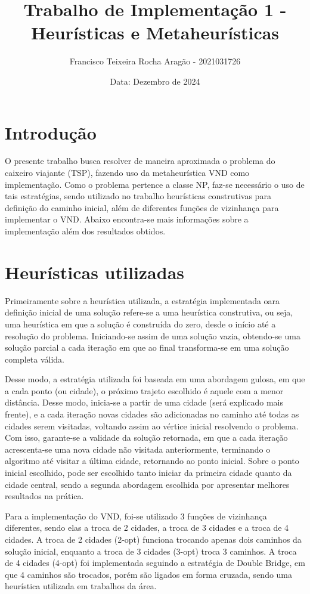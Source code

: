 \documentclass[10pt]{extarticle} %
\title{Trabalho de Implementação 1 - Heurísticas e Metaheurísticas}
\author{Francisco Teixeira Rocha Aragão - 2021031726}
\date{Data: Dezembro de 2024}
\begin{document}
\maketitle

\section{Introdução}

O presente trabalho busca resolver de maneira aproximada o problema do caixeiro viajante (TSP), fazendo uso da metaheurística VND como implementação. Como o problema pertence a classe NP, faz-se necessário o uso de tais estratégias, sendo utilizado no trabalho heurísticas construtivas para definição do caminho inicial, além de diferentes funções de vizinhança para implementar o VND. Abaixo encontra-se mais informações sobre a implementação além dos resultados obtidos.

\section{Heurísticas utilizadas}

Primeiramente sobre a heurística utilizada, a estratégia implementada oara definição inicial de uma solução refere-se a uma heurística construtiva, ou seja, uma heurística em que a solução é construída do zero, desde o início até a resolução do problema. Iniciando-se assim de uma solução vazia, obtendo-se uma solução parcial a cada iteração em que ao final transforma-se em uma solução completa válida.

Desse modo, a estratégia utilizada foi baseada em uma abordagem gulosa, em que a cada ponto (ou cidade), o próximo trajeto escolhido é aquele com a menor distância. Desse modo, inicia-se a partir de uma cidade (será explicado mais frente), e a cada iteração novas cidades são adicionadas no caminho até todas as cidades serem visitadas, voltando assim ao vértice inicial resolvendo o problema. Com isso, garante-se a validade da solução retornada, em que a cada iteração acrescenta-se uma nova cidade não visitada anteriormente, terminando o algoritmo até visitar a última cidade, retornando ao ponto inicial. Sobre o ponto inicial escolhido, pode ser escolhido tanto iniciar da primeira cidade quanto da cidade central, sendo a segunda abordagem escolhida por apresentar melhores resultados na prática.

Para a implementação do VND, foi-se utilizado 3 funções de vizinhança diferentes, sendo elas a troca de 2 cidades, a troca de 3 cidades e a troca de 4 cidades. A troca de 2 cidades (2-opt) funciona trocando apenas dois caminhos da solução inicial, enquanto a troca de 3 cidades (3-opt) troca 3 caminhos. A troca de 4 cidades (4-opt) foi implementada seguindo a estratégia de Double Bridge, em que 4 caminhos são trocados, porém são ligados em forma cruzada, sendo uma heurística utilizada em trabalhos da área. 
\end{document}
